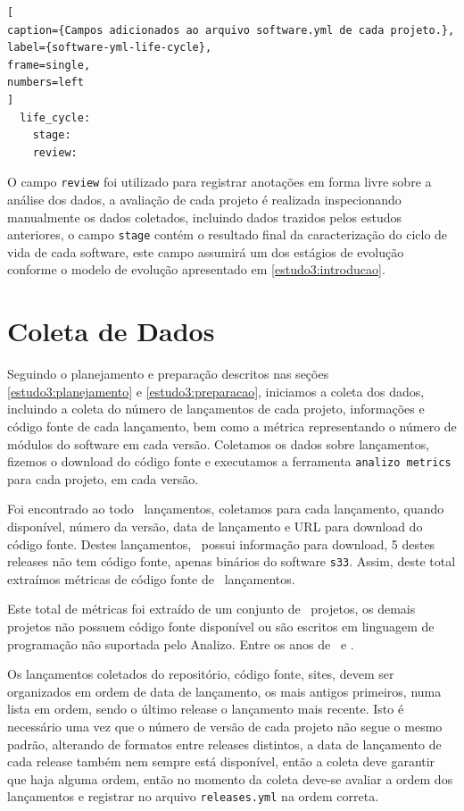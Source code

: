 \begin{lstlisting}[
caption={Campos adicionados ao arquivo software.yml de cada projeto.},
label={software-yml-life-cycle},
frame=single,
numbers=left
]
  life_cycle:
    stage:
    review:
\end{lstlisting}

O campo \texttt{review} foi utilizado para registrar anotações em forma livre
sobre a análise dos dados, a avaliação de cada projeto é realizada
inspecionando manualmente os dados coletados, incluindo dados trazidos pelos
estudos anteriores, o campo \texttt{stage} contém o resultado final da
caracterização do ciclo de vida de cada software, este campo assumirá um dos
estágios de evolução conforme o modelo de evolução apresentado em
\ref{estudo3:introducao}.


\section{Coleta de Dados} \label{estudo3:coleta} %

Seguindo o planejamento e preparação descritos nas seções
\ref{estudo3:planejamento} e \ref{estudo3:preparacao}, iniciamos a coleta dos
dados, incluindo a coleta do número de lançamentos de cada projeto, informações
e código fonte de cada lançamento, bem como a métrica representando o número de
módulos do software em cada versão. Coletamos os dados sobre lançamentos,
fizemos o download do código fonte e executamos a ferramenta \texttt{analizo
metrics} para cada projeto, em cada versão.

Foi encontrado ao todo \ReleasesCount \ lançamentos, coletamos para cada
lançamento, quando disponível, número da versão, data de lançamento e URL para
download do código fonte. Destes lançamentos, \ReleasesAvailableCount \ possui
informação para download, 5 destes releases não tem código fonte, apenas
binários do software \texttt{s33}. Assim, deste total extraímos métricas
de código fonte de \ReleasesMetricsCount \ lançamentos.

Este total de métricas foi extraído de um conjunto de \ProjectsAnalizedCount \
projetos, os demais projetos não possuem código fonte disponível ou são
escritos em linguagem de programação não suportada pelo Analizo. Entre os anos
de \ReleasesYearFirst \ e \ReleasesYearLast.

Os lançamentos coletados do repositório, código fonte, sites, devem ser
organizados em ordem de data de lançamento, os mais antigos primeiros, numa
lista em ordem, sendo o último release o lançamento mais recente. Isto é
necessário uma vez que o número de versão de cada projeto não segue o mesmo
padrão, alterando de formatos entre releases distintos, a data de lançamento de
cada release também nem sempre está disponível, então a coleta deve garantir
que haja alguma ordem, então no momento da coleta deve-se avaliar a ordem dos
lançamentos e registrar no arquivo \texttt{releases.yml} na ordem correta.

